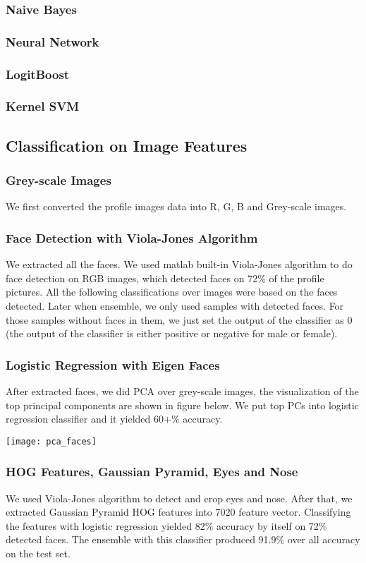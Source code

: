 \subsubsection{Naive Bayes}
\subsubsection{Neural Network}
\subsubsection{LogitBoost}
\subsubsection{Kernel SVM}
\subsection{Classification on Image Features}
\subsubsection{Grey-scale Images}
We first converted the profile images data into R, G, B and Grey-scale images. 
\subsubsection{Face Detection with Viola-Jones Algorithm}
We extracted all the faces. We used matlab built-in Viola-Jones algorithm to do face detection on RGB images, which detected faces on 72\% of the profile pictures. All the following classifications over images were based on the faces detected. Later when ensemble, we only used samples with detected faces. For those samples without faces in them, we just set the output of the classifier as 0 (the output of the classifier is either positive or negative for male or female).
\subsubsection{Logistic Regression with Eigen Faces}
After extracted faces, we did PCA over grey-scale images, the visualization of the top principal components are shown in figure below. We put top PCs into logistic regression classifier and it yielded 60+\% accuracy. \\
\begin{center}
\texttt{[image: pca\_faces]}
\end{center}
\subsubsection{HOG Features, Gaussian Pyramid, Eyes and Nose}
We used Viola-Jones algorithm to detect and crop eyes and nose. After that, we extracted Gaussian Pyramid HOG features into 7020 feature vector. Classifying the features with logistic regression yielded 82\% accuracy by itself on 72\% detected faces. The ensemble with this classifier produced 91.9\% over all accuracy on the test set. 
